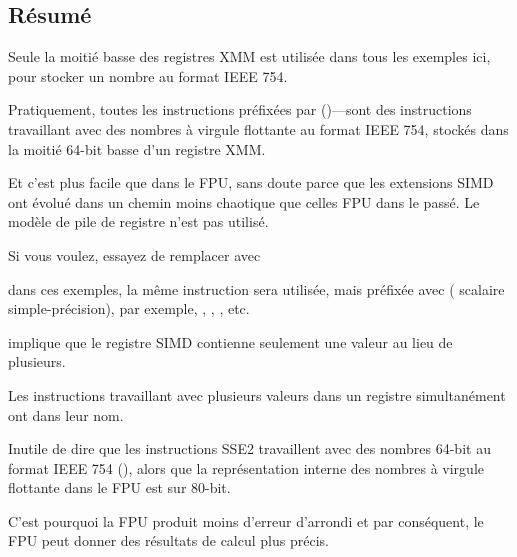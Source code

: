 

\subsection{Résumé}

Seule la moitié basse des registres XMM est utilisée dans tous les exemples ici,
pour stocker un nombre au format IEEE 754.

Pratiquement, toutes les instructions préfixées par  ()---sont
des instructions travaillant avec des nombres à virgule flottante au format IEEE
754, stockés dans la moitié 64-bit basse d'un registre XMM.

Et c'est plus facile que dans le FPU, sans doute parce que les extensions SIMD ont
évolué dans un chemin moins chaotique que celles FPU dans le passé.
Le modèle de pile de registre n'est pas utilisé.

Si vous voulez, essayez de remplacer \Tdouble avec \Tfloat

dans ces exemples, la même instruction sera utilisée, mais préfixée avec 
( scalaire simple-précision), par exemple, ,
, , etc.

implique que le registre SIMD contienne seulement une valeur au lieu de plusieurs.

Les instructions travaillant avec plusieurs valeurs dans un registre simultanément
ont  dans leur nom.

Inutile de dire que les instructions SSE2 travaillent avec des nombres 64-bit au
format IEEE 754 (\Tdouble), alors que la représentation interne des nombres à virgule
flottante dans le FPU est sur 80-bit.

C'est pourquoi la FPU produit moins d'erreur d'arrondi et par conséquent, le FPU
peut donner des résultats de calcul plus précis.
